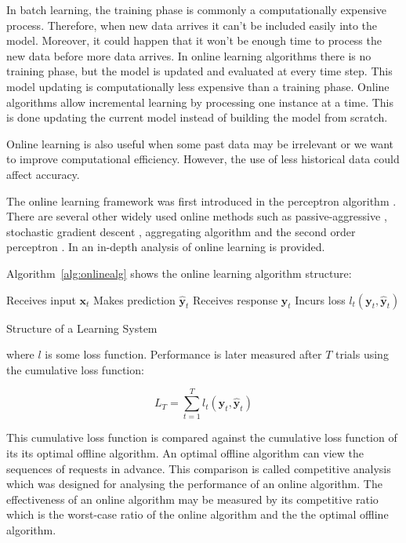 \documentclass[twocolumn]{svjour3}          %
\begin{document}
In batch learning, the training phase is commonly a computationally expensive
process. Therefore, when new data arrives it can't be included easily into the
model. Moreover, it could happen that it won't be enough time to process the
new data before more data arrives. In online learning algorithms there is no
training phase, but the model is updated and evaluated at every time step. This
model updating is computationally less expensive than a training phase.
Online algorithms allow incremental learning by processing one instance at a
time. This is done updating the current model instead of building the model from
scratch.

Online learning is also useful when some past data may be irrelevant
or we want to improve computational efficiency. However, the use of less
historical data could affect accuracy.

The online learning framework was first introduced in the perceptron algorithm
\cite{rosenblatt58}. There are several other widely used online methods such as
passive-aggressive \cite{crammerETall2006}, stochastic gradient descent
\cite{zhang2004}, aggregating algorithm \cite{vovk2001} and the second order
perceptron \cite{cesa-bianchi2005}.  In \cite{cesa-bianchi2006} an in-depth
analysis of online learning is provided.

Algorithm~\ref{alg:onlinealg} shows the online learning algorithm structure:

\begin{algorithm}[ht]
\begin{algorithmic}[1]
    \STATE Receives input $\mathbf{x}_t$
    \STATE Makes prediction $\mathbf{\hat{y}}_t$
    \STATE Receives response $\mathbf{y}_t$
    \STATE Incurs loss $l_t(\mathbf{y}_t,\mathbf{\hat{y}}_t)$
\end{algorithmic}
\caption{Structure of a Learning System}
\label{alg:onlinealg}
\end{algorithm}

\noindent where $l$ is some loss function. Performance is later measured after
$T$ trials using the cumulative loss function:

\begin{equation*}
L_T = \sum_{t=1}^T l_t(\mathbf{y}_t,\mathbf{\hat{y}}_t)
\end{equation*}

This cumulative loss function is compared against the cumulative loss function of its its optimal offline algorithm. An optimal offline algorithm can view the sequences of requests in advance. 
This comparison is called competitive analysis  \cite{sleator1985}  which was designed for analysing the performance of an online algorithm. 
The effectiveness of an online algorithm may be measured by its competitive ratio which is the worst-case ratio of the online algorithm and the the optimal offline algorithm.
\end{document}
